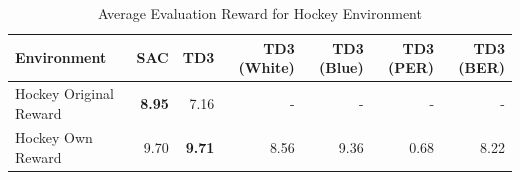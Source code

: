 \begin{table}[H]
\caption{Average Evaluation Reward for Hockey Environment}\centering {}
\label{tab:avg_reward}
\begin{tabular}{lrrrrrr}
\toprule
Environment & SAC & TD3 & TD3 (White) & TD3 (Blue) & TD3 (PER) & TD3 (BER) \\
\midrule
Hockey Original Reward & \textbf{8.95} & 7.16 & - & - & - & - \\
Hockey Own Reward & 9.70 & \textbf{9.71} & 8.56 & 9.36 & 0.68 & 8.22 \\
\bottomrule
\end{tabular}
\end{table}
